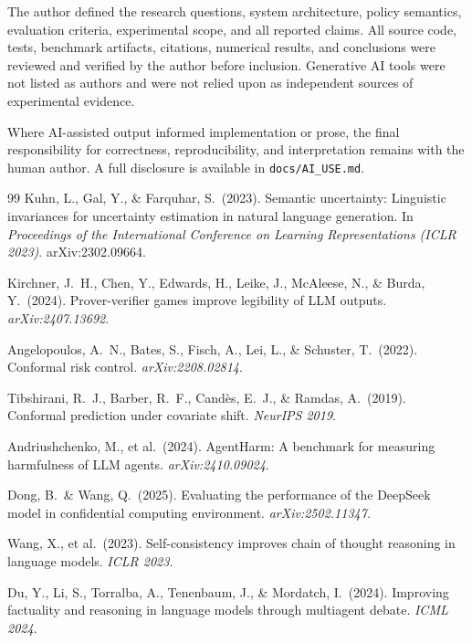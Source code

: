 \documentclass[10pt,twocolumn]{article}
\begin{document}
The author defined the research questions, system architecture, policy
semantics, evaluation criteria, experimental scope, and all reported
claims. All source code, tests, benchmark artifacts, citations, numerical
results, and conclusions were reviewed and verified by the author before
inclusion. Generative AI tools were not listed as authors and were not
relied upon as independent sources of experimental evidence.

Where AI-assisted output informed implementation or prose, the final
responsibility for correctness, reproducibility, and interpretation remains
with the human author. A full disclosure is available in
\texttt{docs/AI\_USE.md}.


\begin{thebibliography}{99}
Kuhn, L., Gal, Y., \& Farquhar, S.\ (2023).
Semantic uncertainty: Linguistic invariances for uncertainty estimation in
natural language generation.
In \emph{Proceedings of the International Conference on Learning Representations
(ICLR 2023)}.
arXiv:2302.09664.

Kirchner, J.~H., Chen, Y., Edwards, H., Leike, J., McAleese, N.,
\& Burda, Y.\ (2024).
Prover-verifier games improve legibility of LLM outputs.
\emph{arXiv:2407.13692}.

Angelopoulos, A.\ N., Bates, S., Fisch, A., Lei, L., \& Schuster, T.\ (2022).
Conformal risk control.
\emph{arXiv:2208.02814}.

Tibshirani, R.\ J., Barber, R.\ F., Cand\`es, E.\ J., \& Ramdas, A.\ (2019).
Conformal prediction under covariate shift.
\emph{NeurIPS 2019}.

Andriushchenko, M., et al.\ (2024).
AgentHarm: A benchmark for measuring harmfulness of LLM agents.
\emph{arXiv:2410.09024}.

Dong, B.\ \& Wang, Q.\ (2025).
Evaluating the performance of the DeepSeek model in confidential computing
environment.
\emph{arXiv:2502.11347}.

Wang, X., et al.\ (2023).
Self-consistency improves chain of thought reasoning in language models.
\emph{ICLR 2023}.

Du, Y., Li, S., Torralba, A., Tenenbaum, J., \& Mordatch, I.\ (2024).
Improving factuality and reasoning in language models through multiagent debate.
\emph{ICML 2024}.


\end{thebibliography}
\end{document}
